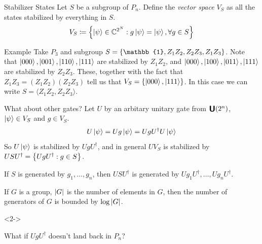 \documentclass[11pt,aspectratio=1610]{beamer}
\newcommand{\unitary}[1]{\raisebox{-1pt}{\scalebox{1.2}{$\bm{\mathsf{U}}$}}\qty(#1)}
\begin{document}
\begin{frame}{Stabilizer States}
	Let $S$ be a subgroup of $P_n$. Define the \emph{vector space} $V_S$ as all the states stabilized by everything in $S$.
	\begin{equation*}
		V_S\coloneqq \qty{\ket{\psi}\in\mathbb{C}^{2^N}: g\ket{\psi} = \ket{\psi}, \forall g\in S}
	\end{equation*}
	\begin{exampleblock}{Example}
		Take $P_3$ and subgroup $S = \qty{\mathbb{1}, Z_1Z_2, Z_2Z_3, Z_1Z_3}$. Note that $\ket{000}, \ket{001}, \ket{110}, \ket{111}$ are stabilized by $Z_1Z_2$, and $\ket{000}, \ket{100}, \ket{011}, \ket{111}$ are stabilized by $Z_2Z_3$. These, together with the fact that $Z_1Z_3 = (Z_1Z_2)(Z_2Z_3)$ tell us that $V_S = \qty{\ket{000}, \ket{111}}$. In this case we can write $S = \langle Z_1Z_2, Z_2Z_3\rangle$.
	\end{exampleblock}
\end{frame}

\begin{frame}[t]{What about other gates?}
	Let $U$ by an arbitary unitary gate from $\unitary{2^n}$, $\ket{\psi}\in V_S$ and $g\in V_S$.
	\begin{equation*}
		U\ket{\psi} = Ug\ket{\psi} = UgU^\dagger U\ket{\psi}
	\end{equation*}
	So $U\ket{\psi}$ is stabilized by $UgU^\dagger$, and in general $UV_S$ is stabilized by $USU^\dagger = \qty{UgU^\dagger : g\in S}$.

	\begin{corollary}
		If $S$ is generated by $g_1,\ldots, g_n$, then $USU^\dagger$ is generated by $Ug_1U^\dagger,\ldots, Ug_nU^\dagger$.
	\end{corollary}

	If $G$ is a group, $\abs{G}$ is the number of elements in $G$, then the number of generators of $G$ is bounded by $\log\abs{G}$.

	\begin{onlyenv}<2->
		\begin{warning}
			\begin{center}
				What if $UgU^\dagger$ doesn't land back in $P_n$?
			\end{center}
		\end{warning}
	\end{onlyenv}
\end{frame}
\end{document}

